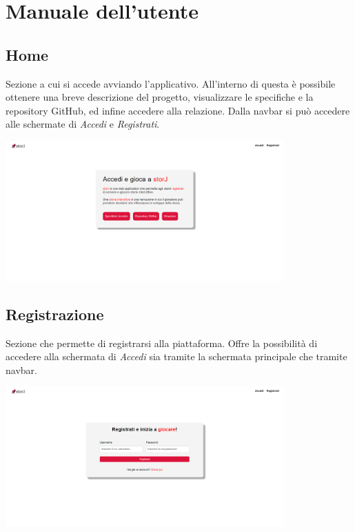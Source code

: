 \documentclass{article}
\begin{document}
\newpage
\section*{Manuale dell'utente}
\subsection*{Home}
Sezione a cui si accede avviando l'applicativo. All'interno di questa è possibile ottenere una breve descrizione del progetto, visualizzare le specifiche e la repository GitHub, ed infine accedere alla relazione. Dalla navbar si può accedere alle schermate di \textit{Accedi} e \textit{Registrati}.
\begin{center}
    \includegraphics[width=0.8\textwidth]{foto4.png}
\end{center}

\subsection*{Registrazione}
Sezione che permette di registrarsi alla piattaforma. Offre la possibilità di accedere alla schermata di \textit{Accedi} sia tramite la schermata principale che tramite navbar.
\begin{center}
    \includegraphics[width=0.8\textwidth]{foto5.png}
\end{center}
\end{document}
